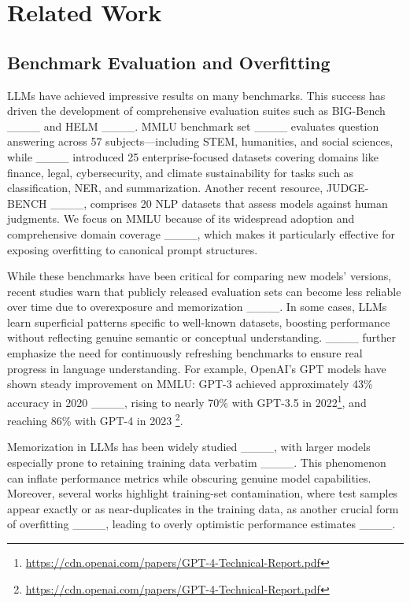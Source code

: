 \section{Related Work}
\label{sec:related_work}
\subsection{Benchmark Evaluation and Overfitting}

LLMs have achieved impressive results on many benchmarks. This success has driven the development of comprehensive evaluation suites such as BIG-Bench ____ and HELM ____. MMLU benchmark set ____ evaluates question answering across 57 subjects—including STEM, humanities, and social sciences, while ____ introduced 25 enterprise-focused datasets covering domains like finance, legal, cybersecurity, and climate sustainability for tasks such as classification, NER, and summarization. Another recent resource, JUDGE-BENCH ____, comprises 20 NLP datasets that assess models against human judgments. We focus on MMLU because of its widespread adoption and comprehensive domain coverage ____, which makes it particularly effective for exposing overfitting to canonical prompt structures.


While these benchmarks have been critical for comparing new models' versions, recent studies warn that publicly released evaluation sets can become less reliable over time due to overexposure and memorization ____. In some cases, LLMs learn superficial patterns specific to well-known datasets, boosting performance without reflecting genuine semantic or conceptual understanding. ____ further emphasize the need for continuously refreshing benchmarks to ensure real progress in language understanding. For example, OpenAI's GPT models have shown steady improvement on MMLU: GPT-3 achieved approximately 43\% accuracy in 2020 ____, rising to nearly 70\% with GPT-3.5 in 2022\footnote{\url{https://cdn.openai.com/papers/GPT-4-Technical-Report.pdf}}, and reaching 86\% with GPT-4 in 2023 \footnote{\url{https://cdn.openai.com/papers/GPT-4-Technical-Report.pdf}}. 

Memorization in LLMs has been widely studied ____, with larger models especially prone to retaining training data verbatim ____. This phenomenon can inflate performance metrics while obscuring genuine model capabilities. Moreover, several works highlight training-set contamination, where test samples appear exactly or as near-duplicates in the training data, as another crucial form of overfitting ____, leading to overly optimistic performance estimates ____.


